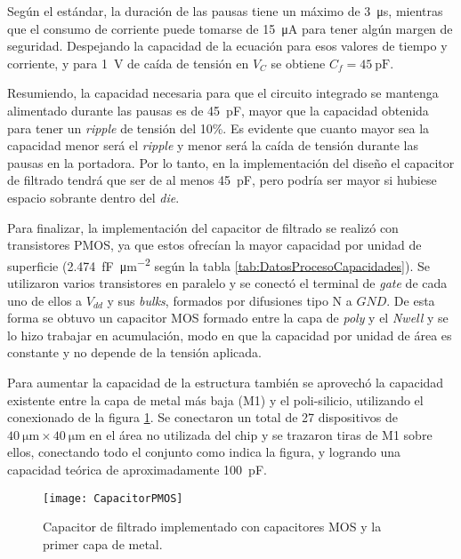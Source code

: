 Según el estándar, la duración de las pausas tiene un máximo de 
\SI{3}{\micro\second}, mientras que el consumo de corriente puede tomarse de 
\SI{15}{\micro\ampere} para tener algún margen de seguridad. Despejando
la capacidad de la ecuación para esos valores de tiempo y corriente, y 
para \SI{1}{\volt} de caída de tensión en \(V_{C}\) se obtiene 
\(C_{f}=\SI{45}{\pico\farad}\).

Resumiendo, la capacidad necesaria para que el circuito integrado se 
mantenga alimentado durante las pausas es de \SI{45}{\pico\farad}, 
mayor que la capacidad obtenida para tener un \emph{ripple} de 
tensión del 10\%. Es evidente que cuanto mayor sea la capacidad 
menor será el \emph{ripple} y menor será la caída de tensión durante 
las pausas en la portadora. Por lo tanto, en la implementación del 
diseño el capacitor de filtrado tendrá que ser de al menos 
\SI{45}{\pico\farad}, pero podría ser mayor si hubiese espacio 
sobrante dentro del \emph{die}.

\bigskip
Para finalizar, la implementación del capacitor de filtrado 
se realizó con transistores PMOS, ya que estos ofrecían la mayor 
capacidad por unidad de superficie (\SI[per-mode=symbol]{2.474}{
\femto\farad\per\micro\meter\squared} según la tabla 
\ref{tab:DatosProcesoCapacidades}). Se utilizaron varios 
transistores en paralelo y se conectó el terminal de \emph{gate} de 
cada uno de ellos a \(V_{dd}\) y sus \emph{bulks}, formados por 
difusiones tipo N a \(GND\). De esta forma se obtuvo un capacitor MOS 
formado entre la capa de \emph{poly} y el \emph{Nwell} y se lo hizo 
trabajar en acumulación, modo en que la capacidad por unidad de área 
es constante y no depende de la tensión aplicada.

Para aumentar la capacidad de la estructura también se aprovechó la 
capacidad existente entre la capa de metal 
más baja (M1) y el poli-silicio, utilizando el conexionado de la 
figura \ref{fig:CapacitoresMOS}. Se conectaron un total de 27 
dispositivos de \(\SI{40}{\micro\meter} \times \SI{40}{\micro\meter}\) 
en el área no utilizada del chip y se trazaron tiras de M1 sobre 
ellos, conectando todo el conjunto como indica la figura, y logrando una 
capacidad teórica de aproximadamente \SI{100}{\pico\farad}.

\begin{figure}
	\centering
	\texttt{[image: CapacitorPMOS]}
	\caption{Capacitor de filtrado implementado con capacitores MOS y 
	la primer capa de metal.}
	\label{fig:CapacitoresMOS}
\end{figure}


